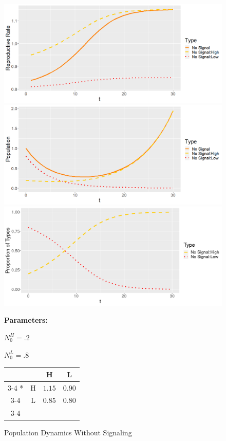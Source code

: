 \begin{figure}[p]
  \caption{Population Dynamics Without Signaling}
   \label{fig:No_Signal}
    \includegraphics[width=\textwidth, height=.28\textheight]{Images/Rate_No_Signal.png}
    \includegraphics[width=\textwidth, height=.28\textheight]{Images/Pop_No_Signal.png}
    \includegraphics[width=\textwidth, height=.28\textheight]{Images/Prop_No_Signal.png}
    \begin{minipage}[c]{.2\textwidth}
    \textbf{Parameters:}
    \end{minipage}\hfill
    \begin{minipage}[c]{.2\textwidth}
    $N_0^H = .2$
    
    $N_0^L = .8$
    \end{minipage}\hfill
  \begin{minipage}[c]{.6\textwidth}
  \begin{tabular}{cc|c|c|}
      & \multicolumn{1}{c}{} & \multicolumn{1}{c}{H}  & \multicolumn{1}{c}{L} \\\cline{3-4}
      \multirow{2}*{}  & H & $1.15$ & $0.90$ \\\cline{3-4}
      & L & $0.85$ & $0.80$ \\\cline{3-4}
    \end{tabular}
    \end{minipage}
    \end{figure}

